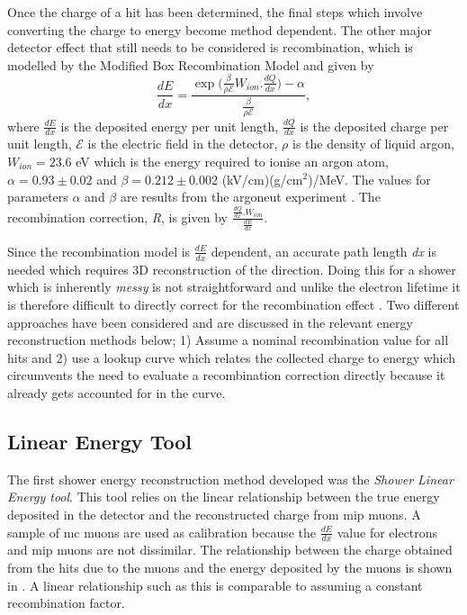 Once the charge of a hit has been determined, the final steps which involve converting the charge to energy become method dependent. The other major detector effect that still needs to be considered is recombination, which is modelled by the Modified Box Recombination Model and given by  
\begin{equation}\label{eqn:ModBox}
    \frac{dE}{dx} = \frac{\exp{(\frac{\beta}{\rho \mathcal{E}} W_{ion}.\frac{dQ}{dx}}) - \alpha}{\frac{\beta}{\rho \mathcal{E}}},
\end{equation}
where $\frac{dE}{dx}$ is the deposited energy per unit length, $\frac{dQ}{dx}$ is the deposited charge per unit length,  $\mathcal{E}$ is the electric field in the detector, $\rho$ is the density of liquid argon, $W_{ion} = 23.6$ eV which is the energy required to ionise an argon atom, $\alpha = 0.93 \pm 0.02$ and $\beta = 0.212 \pm 0.002$ (kV/cm)(g/cm$^2$)/MeV. The values for parameters $\alpha$ and $\beta$ are results from the \Gls{argoneut} experiment \cite{ArgoNeuT_recombination_paper}. The recombination correction, \textit{R}, is given by $\frac{\frac{dQ}{dx}.W_{ion}}{\frac{dE}{dx}}$.


Since the recombination model is $\frac{dE}{dx}$ dependent, an accurate path length \textit{dx} is needed which requires 3D reconstruction of the direction. Doing this for a shower which is inherently \textit{messy} is not straightforward and unlike the electron lifetime it is therefore difficult to directly correct for the recombination effect \cite{MicroBooNE_photon_Ereco_paper}. Two different approaches have been considered and are discussed in the relevant energy reconstruction methods below; 1) Assume a nominal recombination value for all hits and 2) use a lookup curve which relates the collected charge to energy which circumvents the need to evaluate a recombination correction directly because it already gets accounted for in the curve.

\subsection{Linear Energy Tool}\label{subchap:Linear Energy Tool}
The first shower energy reconstruction method developed was the \textit{Shower Linear Energy tool}. This tool relies on the linear relationship between the true energy deposited in the detector and the reconstructed charge from \gls{mip} muons. A sample of \Gls{mc} muons are used as calibration because the $\frac{dE}{dx}$ value for electrons and \Gls{mip} muons are not dissimilar. The relationship between the charge obtained from the hits due to the muons and the energy deposited by the muons is shown in . A linear relationship such as this is comparable to assuming a constant recombination factor. 



